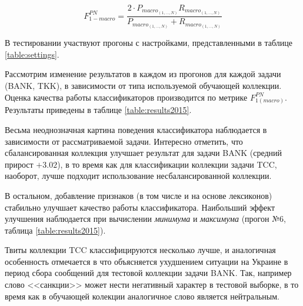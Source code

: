 \begin{equation}
    \label{eq:fmacro12}
    F_{1-macro}^{PN} = \dfrac{2 \cdot P_{macro_{(1,\ldots, N)}} R_{macro_{(1,\ldots, N)}} }{P_{macro_{(1,\ldots, N)}} + R_{macro_{(1,\ldots, N)}}}
\end{equation}

В тестировании участвуют прогоны с настройками, представленными в таблице
\ref{table:settings}.



Рассмотрим изменение результатов в каждом из прогонов для каждой задачи
(BANK, TKK), в зависимости от типа используемой обучающей коллекции.
Оценка качества работы классификаторов производится по метрике
$F_{1(macro)}^{PN}$.
Результаты приведены в таблице
\ref{table:results2015}.



Весьма неоднозначная картина поведения классификатора наблюдается в зависимости
от рассматриваемой задачи.
Интересно отметить, что сбалансированная коллекция улучшает результат для
задачи BANK (средний прирост $+3.02$), в то время как для классификации
коллекции задачи TCC, наоборот, лучше подходит использование несбалансированной
коллекции.

В остальном, добавление признаков (в том числе и на основе лексиконов)
стабильно улучшает качество работы классификатора.
Наибольший эффект улучшения наблюдается при вычислении
{\it минимума } и {\it максимума} (прогон №6, таблица \ref{table:results2015}).

Твиты коллекции TCC классифицируются несколько лучше, и аналогичная особенность
отмечается в \cite{tonalityAnalysis} что объясняется ухудшением ситуации на
Украине в период сбора сообщений для тестовой коллекции задачи BANK.
Так, например слово <<санкции>> может нести негативный характер в тестовой
выборке, в то время как в обучающей колекции аналогичное слово является
нейтральным.
